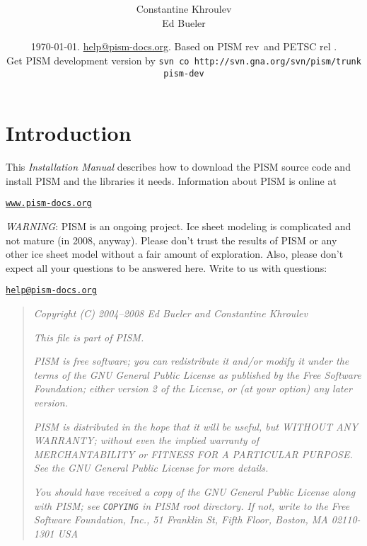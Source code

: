 \documentclass[11pt,final]{amsart}
\title[PISM Installation Manual]{\protect{\Large \emph{PISM}, a Parallel Ice
    Sheet Model:\normalsize} \\ \protect{\Large \bigskip \bigskip Installation
    Manual\normalsize}}
\author[]{Constantine Khroulev \\ Ed Bueler}
\date{\today. \href{mailto:help@pism-docs.org}{help@pism-docs.org}. Based on
  PISM rev \PISMREV\,and PETSC rel \PETSCREL. \\ Get PISM development version
  by \quad\texttt{svn co http://svn.gna.org/svn/pism/trunk pism-dev}\quad}
\renewcommand{\t}[1]{\texttt{#1}}
\begin{document}
\maketitle
\thispagestyle{empty}

\vspace{1.5in}
\setcounter{tocdepth}{2}
\tableofcontents



\newpage
\section*{Introduction}

\large
This \emph{Installation Manual} describes how to download the PISM source code and install PISM and the libraries it needs.  Information about PISM is online at
\bigskip
\begin{center}
  \href{http://www.pism-docs.org}{\t{www.pism-docs.org}}
\end{center}
\bigskip

\emph{WARNING}:  PISM is an ongoing project.  Ice sheet modeling is complicated and not mature (in 2008, anyway).  Please don't trust the results of PISM or any other ice sheet model without a fair amount of exploration.  Also, please don't expect all your questions to be answered here.  Write to us with questions: \bigskip

\centerline{\href{mailto:help@pism-docs.org}{\texttt{help@pism-docs.org}}}
\vfill

\begin{quote}
\textsl{Copyright (C) 2004--2008 Ed Bueler and Constantine Khroulev}
\medskip

\noindent \textsl{This file is part of PISM.}
\medskip

\noindent \textsl{PISM is free software; you can redistribute it and/or modify it under the terms of the GNU General Public
  License as published by the Free Software Foundation; either version 2 of the License, or (at your option) any later version.}
\medskip

\noindent \textsl{PISM is distributed in the hope that it will be useful, but WITHOUT ANY WARRANTY; without even the implied
  warranty of MERCHANTABILITY or FITNESS FOR A PARTICULAR PURPOSE. See the GNU General Public License for more details.} \medskip

\noindent \textsl{You should have received a copy of the GNU General Public License along
  with PISM; see \emph{\texttt{COPYING}} in PISM root directory. If not, write to the Free Software Foundation, Inc., 51 Franklin
  St, Fifth Floor, Boston, MA 02110-1301 USA}
\end{quote}
\end{document}
